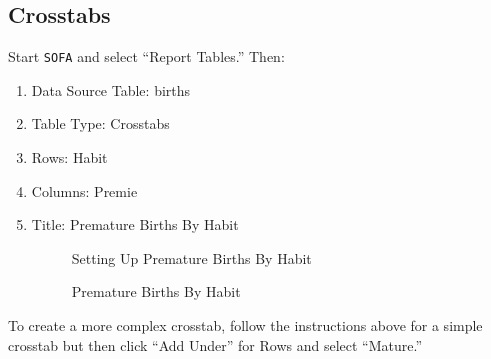 \subsection{Crosstabs}

Start \texttt{SOFA} and select ``Report Tables.'' Then:

\begin{enumerate}
  \item Data Source Table: births
  \item Table Type: Crosstabs
  \item Rows: Habit
  \item Columns: Premie
  \item Title: Premature Births By Habit
  
  \begin{figure}[H]
    \begin{center}
      \caption{Setting Up Premature Births By Habit}
    \end{center}
  \end{figure}

  \begin{figure}[H]
    \begin{center}
      \caption{Premature Births By Habit}
    \end{center}
  \end{figure}
  
\end{enumerate}

To create a more complex crosstab, follow the instructions above for a simple crosstab but then click ``Add Under'' for Rows and select ``Mature.'' 

